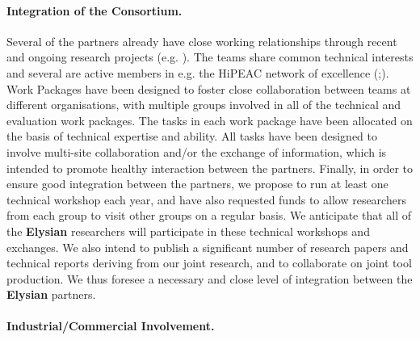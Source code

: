 \documentclass[a4paper,11pt]{article}
\newcommand{\project}[1]{\textbf{#1}\xspace}
\newcommand{\SECURITY}{\project{Elysian}}
\newcommand{\TheProject}{\SECURITY}
\begin{document}
\paragraph*{Integration of the Consortium.}

Several of the partners already have close working relationships through
recent and ongoing research projects (e.g. \rephrase).
The teams share common technical interests and several are active members in e.g. the
HiPEAC network of excellence (\SAshort{};).
Work Packages have been designed to foster close collaboration
between teams at different organisations, with multiple groups involved in all of
the technical and evaluation work packages. The tasks in 
each work package have been allocated on the basis of
technical expertise and ability. All tasks have been designed to involve multi-site
collaboration and/or the exchange of information, which is
intended to promote healthy interaction between the partners.
Finally, in order to ensure good integration between the partners,
we propose to run at least one technical workshop each year, and
have also requested funds to allow researchers from each group
to visit other groups on a regular basis.  We anticipate that
all of the \TheProject{} researchers will participate in these
technical workshops and exchanges.  We also intend to publish a significant
number of research papers and technical reports deriving from our joint research,
and to collaborate on joint tool production. 
We thus foresee a necessary and close level of integration between
the \TheProject{} partners.

\paragraph{Industrial/Commercial Involvement.}
\end{document}
